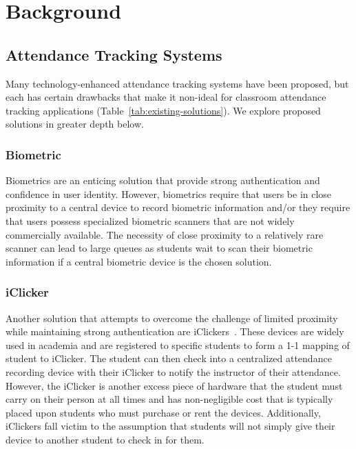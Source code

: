 \section{Background}

\label{sec:background}

\subsection{Attendance Tracking Systems}

Many technology-enhanced attendance tracking systems have been proposed, but
each has certain drawbacks that make it non-ideal for classroom attendance
tracking applications (Table~\ref{tab:existing-solutions}). We explore proposed
solutions in greater depth below.

\subsubsection{Biometric}

Biometrics are an enticing solution that provide strong authentication and
confidence in user identity. However, biometrics require that users be in close
proximity to a central device to record biometric information and/or they
require that users possess specialized biometric scanners that are not widely
commercially available. The necessity of close proximity to a relatively rare
scanner can lead to large queues as students wait to scan their biometric
information if a central biometric device is the chosen solution.

\subsubsection{iClicker}

Another solution that attempts to overcome the challenge of limited proximity
while maintaining strong authentication are iClickers~\cite{iclicker}. These
devices are widely used in academia and are registered to specific students to
form a 1-1 mapping of student to iClicker. The student can then check into a
centralized attendance recording device with their iClicker to notify the
instructor of their attendance. However, the iClicker is another excess piece
of hardware that the student must carry on their person at all times and has
non-negligible cost that is typically placed upon students who  must purchase
or rent the devices. Additionally, iClickers fall victim to the assumption that
students will not simply give their device to another student to check in for
them.

